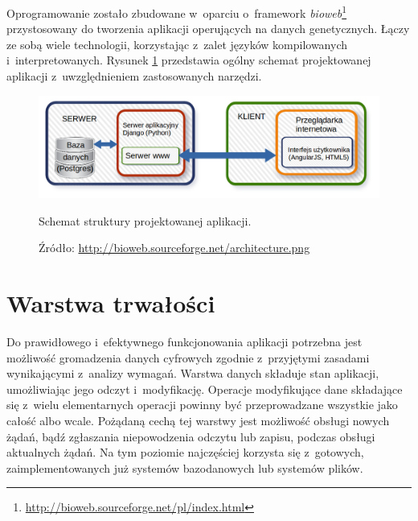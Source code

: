 \documentclass[a4paper,12pt,oneside]{mwrep}  %
\begin{document}
Oprogramowanie zostało zbudowane w~oparciu o~framework \emph{bioweb}\footnote{\url{http://bioweb.sourceforge.net/pl/index.html}} przystosowany do tworzenia aplikacji operujących na danych genetycznych. Łączy ze sobą wiele technologii, korzystając z~zalet języków kompilowanych i~interpretowanych. Rysunek \ref{ogolny_schemat} przedstawia ogólny schemat projektowanej aplikacji z~uwzględnieniem zastosowanych narzędzi.





\begin{figure}[h]
\centering
\includegraphics[width=1\textwidth]{grafika/ogolny_schemat.png}
\caption{Schemat struktury projektowanej aplikacji.}
\vspace{-0.8cm}
\caption*{\scriptsize Źródło: \url{http://bioweb.sourceforge.net/architecture.png}}
\label{ogolny_schemat}
\end{figure}
\section{Warstwa trwałości}
Do prawidłowego i~efektywnego funkcjonowania aplikacji potrzebna jest możliwość gromadzenia danych cyfrowych zgodnie z~przyjętymi zasadami wynikającymi z~analizy wymagań. Warstwa danych składuje stan aplikacji, umożliwiając jego odczyt i~modyfikację. Operacje modyfikujące dane składające się z~wielu elementarnych operacji powinny być przeprowadzane wszystkie jako całość albo wcale. Pożądaną cechą tej warstwy jest możliwość obsługi nowych żądań, bądź zgłaszania niepowodzenia odczytu lub zapisu, podczas obsługi aktualnych żądań. Na tym poziomie najczęściej korzysta się z~gotowych, zaimplementowanych już systemów bazodanowych lub systemów plików.  %
\end{document}
